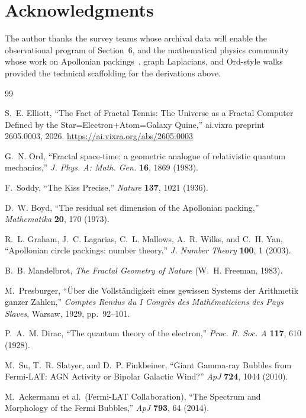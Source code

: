 \documentclass[11pt,a4paper]{article}
\begin{document}
\section*{Acknowledgments}
The author thanks the survey teams whose archival data will enable the
observational program of Section~6, and the mathematical physics community
whose work on Apollonian packings~\cite{Boyd1973,Graham2003}, graph
Laplacians, and Ord-style walks~\cite{Ord1983} provided the technical
scaffolding for the derivations above.

\begin{thebibliography}{99}

S.~E. Elliott,
``The Fact of Fractal Tennis: The Universe as a Fractal Computer Defined by
the Star=Electron+Atom=Galaxy Quine,''
ai.vixra preprint 2605.0003, 2026.
\url{https://ai.vixra.org/abs/2605.0003}

G.~N. Ord,
``Fractal space-time: a geometric analogue of relativistic quantum mechanics,''
\textit{J. Phys. A: Math. Gen.} \textbf{16}, 1869 (1983).

F.~Soddy,
``The Kiss Precise,''
\textit{Nature} \textbf{137}, 1021 (1936).

D.~W. Boyd,
``The residual set dimension of the Apollonian packing,''
\textit{Mathematika} \textbf{20}, 170 (1973).

R.~L. Graham, J.~C. Lagarias, C.~L. Mallows, A.~R. Wilks, and C.~H. Yan,
``Apollonian circle packings: number theory,''
\textit{J. Number Theory} \textbf{100}, 1 (2003).

B.~B. Mandelbrot,
\textit{The Fractal Geometry of Nature}
(W.~H. Freeman, 1983).

M.~Presburger,
``\"Uber die Vollst\"andigkeit eines gewissen Systems der Arithmetik ganzer
Zahlen,''
\textit{Comptes Rendus du I Congr\`es des Math\'ematiciens des Pays Slaves},
Warsaw, 1929, pp.~92--101.

P.~A.~M. Dirac,
``The quantum theory of the electron,''
\textit{Proc. R. Soc. A} \textbf{117}, 610 (1928).

M.~Su, T.~R. Slatyer, and D.~P. Finkbeiner,
``Giant Gamma-ray Bubbles from Fermi-LAT: AGN Activity or Bipolar Galactic Wind?''
\textit{ApJ} \textbf{724}, 1044 (2010).

M.~Ackermann et al.\ (Fermi-LAT Collaboration),
``The Spectrum and Morphology of the Fermi Bubbles,''
\textit{ApJ} \textbf{793}, 64 (2014).


\end{thebibliography}
\end{document}
